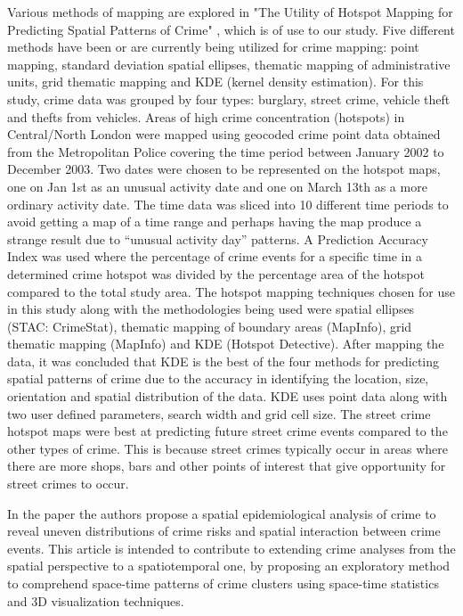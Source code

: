 \documentclass{sigkddExp}
\begin{document}
Various methods of mapping are explored in "The Utility of Hotspot Mapping for Predicting Spatial Patterns of Crime" \cite{Chainey}, which is of use to our study. Five different methods have been or are currently being utilized for crime mapping: point mapping, standard deviation spatial ellipses, thematic mapping of administrative units, grid thematic mapping and KDE (kernel density estimation). For this study, crime data was grouped by four types: burglary, street crime, vehicle theft and thefts from vehicles. Areas of high crime concentration (hotspots) in Central/North London were mapped using geocoded crime point data obtained from the Metropolitan Police covering the time period between January 2002 to December 2003. Two dates were chosen to be represented on the hotspot maps, one on Jan 1st as an unusual activity date and one on March 13th as a more ordinary activity date. The time data was sliced into 10 different time periods to avoid getting a map of a time range and perhaps having the map produce a strange result due to “unusual activity day” patterns. A Prediction Accuracy Index was used where the percentage of crime events for a specific time in a determined crime hotspot was divided by the percentage area of the hotspot compared to the total study area. The hotspot mapping techniques chosen for use in this study along with the methodologies being used were spatial ellipses (STAC: CrimeStat), thematic mapping of boundary areas (MapInfo), grid thematic mapping (MapInfo) and KDE (Hotspot Detective). After mapping the data, it was concluded that KDE is the best of the four methods for predicting spatial patterns of crime due to the accuracy in identifying the location, size, orientation and spatial distribution of the data. KDE uses point data along with two user defined parameters, search width and grid cell size. The street crime hotspot maps were best at predicting future street crime events compared to the other types of crime. This is because street crimes typically occur in areas where there are more shops, bars and other points of interest that give opportunity for street crimes to occur. 

In the paper \cite{visCrime} the authors propose a spatial epidemiological analysis of crime to reveal uneven distributions of crime risks and spatial interaction between crime events. This article is intended to contribute to extending crime analyses from the spatial perspective to a spatiotemporal one, by proposing an exploratory method to comprehend space-time patterns of crime clusters using space-time statistics and 3D visualization techniques. 
\end{document}
